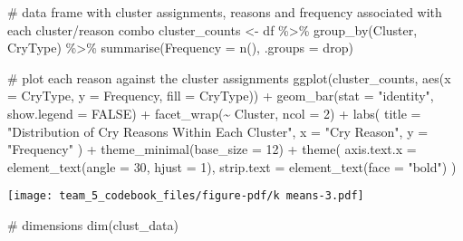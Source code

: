\documentclass[
  letterpaper,
  DIV=11,
  numbers=noendperiod]{scrartcl}
\newenvironment{Shaded}{\begin{snugshade}}{\end{snugshade}}
\newcommand{\AttributeTok}[1]{\textcolor[rgb]{0.40,0.45,0.13}{#1}}
\newcommand{\CommentTok}[1]{\textcolor[rgb]{0.37,0.37,0.37}{#1}}
\newcommand{\ConstantTok}[1]{\textcolor[rgb]{0.56,0.35,0.01}{#1}}
\newcommand{\DecValTok}[1]{\textcolor[rgb]{0.68,0.00,0.00}{#1}}
\newcommand{\FunctionTok}[1]{\textcolor[rgb]{0.28,0.35,0.67}{#1}}
\newcommand{\NormalTok}[1]{\textcolor[rgb]{0.00,0.23,0.31}{#1}}
\newcommand{\OtherTok}[1]{\textcolor[rgb]{0.00,0.23,0.31}{#1}}
\newcommand{\SpecialCharTok}[1]{\textcolor[rgb]{0.37,0.37,0.37}{#1}}
\newcommand{\StringTok}[1]{\textcolor[rgb]{0.13,0.47,0.30}{#1}}
\begin{document}
\begin{Shaded}
\begin{Highlighting}[]
\CommentTok{\# data frame with cluster assignments, reasons and frequency associated with each cluster/reason combo}
\NormalTok{cluster\_counts }\OtherTok{\textless{}{-}}\NormalTok{ df }\SpecialCharTok{\%\textgreater{}\%}
  \FunctionTok{group\_by}\NormalTok{(Cluster, CryType) }\SpecialCharTok{\%\textgreater{}\%}
  \FunctionTok{summarise}\NormalTok{(}\AttributeTok{Frequency =} \FunctionTok{n}\NormalTok{(), }\AttributeTok{.groups =} \StringTok{\textquotesingle{}drop\textquotesingle{}}\NormalTok{)}

\CommentTok{\# plot each reason against the cluster assignments}
\FunctionTok{ggplot}\NormalTok{(cluster\_counts, }\FunctionTok{aes}\NormalTok{(}\AttributeTok{x =}\NormalTok{ CryType, }\AttributeTok{y =}\NormalTok{ Frequency, }\AttributeTok{fill =}\NormalTok{ CryType)) }\SpecialCharTok{+}
  \FunctionTok{geom\_bar}\NormalTok{(}\AttributeTok{stat =} \StringTok{"identity"}\NormalTok{, }\AttributeTok{show.legend =} \ConstantTok{FALSE}\NormalTok{) }\SpecialCharTok{+}
  \FunctionTok{facet\_wrap}\NormalTok{(}\SpecialCharTok{\textasciitilde{}}\NormalTok{ Cluster, }\AttributeTok{ncol =} \DecValTok{2}\NormalTok{) }\SpecialCharTok{+}
  \FunctionTok{labs}\NormalTok{(}
    \AttributeTok{title =} \StringTok{"Distribution of Cry Reasons Within Each Cluster"}\NormalTok{,}
    \AttributeTok{x =} \StringTok{"Cry Reason"}\NormalTok{,}
    \AttributeTok{y =} \StringTok{"Frequency"}
\NormalTok{  ) }\SpecialCharTok{+}
  \FunctionTok{theme\_minimal}\NormalTok{(}\AttributeTok{base\_size =} \DecValTok{12}\NormalTok{) }\SpecialCharTok{+}
  \FunctionTok{theme}\NormalTok{(}
    \AttributeTok{axis.text.x =} \FunctionTok{element\_text}\NormalTok{(}\AttributeTok{angle =} \DecValTok{30}\NormalTok{, }\AttributeTok{hjust =} \DecValTok{1}\NormalTok{),}
    \AttributeTok{strip.text =} \FunctionTok{element\_text}\NormalTok{(}\AttributeTok{face =} \StringTok{"bold"}\NormalTok{)}
\NormalTok{  )}
\end{Highlighting}
\end{Shaded}

\begin{center}
\texttt{[image: team\_5\_codebook\_files/figure-pdf/k means-3.pdf]}
\end{center}

\begin{Shaded}
\begin{Highlighting}[]
\CommentTok{\# dimensions}
\FunctionTok{dim}\NormalTok{(clust\_data)}
\end{Highlighting}
\end{Shaded}
\end{document}
